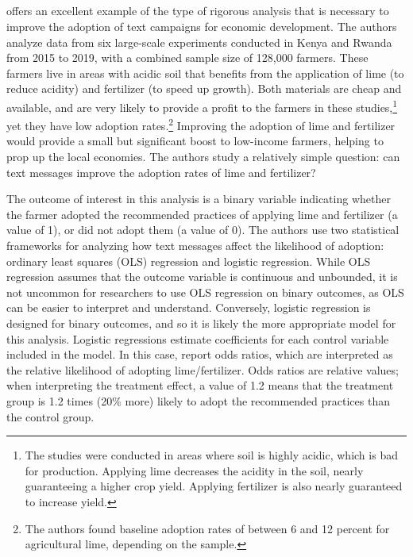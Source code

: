 \documentclass[12pt]{article}
\begin{document}
\subsection{\textcite{fabregas_digital_2025}}
\textcite{fabregas_digital_2025} offers an excellent example of the type of rigorous analysis that is necessary to improve the adoption of text campaigns for economic development. The authors analyze data from six large-scale experiments conducted in Kenya and Rwanda from 2015 to 2019, with a combined sample size of 128,000 farmers. These farmers live in areas with acidic soil that benefits from the application of lime (to reduce acidity) and fertilizer (to speed up growth). Both materials are cheap and available, and are very likely to provide a profit to the farmers in these studies,\footnote{The studies were conducted in areas where soil is highly acidic, which is bad for production. Applying lime decreases the acidity in the soil, nearly guaranteeing a higher crop yield. Applying fertilizer is also nearly guaranteed to increase yield.} yet they have low adoption rates.\footnote{The authors found baseline adoption rates of between 6 and 12 percent for agricultural lime, depending on the sample.} Improving the adoption of lime and fertilizer would provide a small but significant boost to low-income farmers, helping to prop up the local economies. The authors study a relatively simple question: can text messages improve the adoption rates of lime and fertilizer?

The outcome of interest in this analysis is a binary variable indicating whether the farmer adopted the recommended practices of applying lime and fertilizer (a value of 1), or did not adopt them (a value of 0). The authors use two statistical frameworks for analyzing how text messages affect the likelihood of adoption: ordinary least squares (OLS) regression and logistic regression. While OLS regression assumes that the outcome variable is continuous and unbounded, it is not uncommon for researchers to use OLS regression on binary outcomes, as OLS can be easier to interpret and understand. Conversely, logistic regression is designed for binary outcomes, and so it is likely the more appropriate model for this analysis. Logistic regressions estimate coefficients for each control variable included in the model. In this case, \textcite{fabregas_digital_2025} report odds ratios, which are interpreted as the relative likelihood of adopting lime/fertilizer. Odds ratios are relative values; when interpreting the treatment effect, a value of 1.2 means that the treatment group is 1.2 times (20\% more) likely to adopt the recommended practices than the control group.
\end{document}
